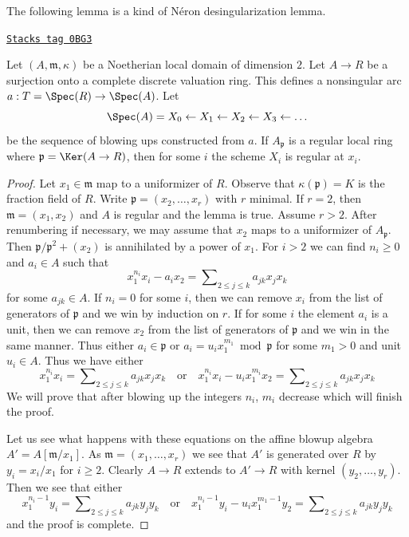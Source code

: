 The following lemma is a kind of N\'eron desingularization lemma.

\begin{lemma}
\label{resolve-lemma-sequence-blowups-along-arc-becomes-nonsingular}
\href{https://stacks.math.columbia.edu/tag/0BG3}{\texttt{Stacks tag 0BG3}}

Let $(A, \mathfrak m, \kappa)$ be a Noetherian local domain of
dimension $2$. Let $A \to R$ be a surjection onto a
complete discrete valuation ring.
This defines a nonsingular arc $a : T = \Spec(R) \to \Spec(A)$. Let
$$
\Spec(A) = X_0 \leftarrow X_1 \leftarrow X_2 \leftarrow X_3 \leftarrow \ldots
$$
be the sequence of blowing ups constructed from $a$.
If $A_\mathfrak p$ is a regular local ring where
$\mathfrak p = \Ker(A \to R)$, then
for some $i$ the scheme $X_i$ is regular at $x_i$.
\end{lemma}

\begin{proof}
Let $x_1 \in \mathfrak m$ map to a uniformizer of $R$.
Observe that $\kappa(\mathfrak p) = K$ is the
fraction field of $R$. Write $\mathfrak p = (x_2, \ldots, x_r)$
with $r$ minimal. If $r = 2$, then $\mathfrak m = (x_1, x_2)$
and $A$ is regular and the lemma is true. Assume $r > 2$.
After renumbering if necessary,
we may assume that $x_2$ maps to a uniformizer of $A_\mathfrak p$.
Then $\mathfrak p/\mathfrak p^2 + (x_2)$ is annihilated by a power
of $x_1$. For $i > 2$ we can find $n_i \geq 0$ and $a_i \in A$
such that
$$
x_1^{n_i} x_i - a_i x_2 = \sum\nolimits_{2 \leq j \leq k} a_{jk} x_jx_k
$$
for some $a_{jk} \in A$. If $n_i = 0$ for some $i$, then we can remove
$x_i$ from the list of generators of $\mathfrak p$ and we win by
induction on $r$. If for some $i$ the element $a_i$ is a unit, then
we can remove $x_2$ from the list of generators of $\mathfrak p$
and we win in the same manner. Thus either
$a_i \in \mathfrak p$ or $a_i = u_i x_1^{m_1} \bmod \mathfrak p$
for some $m_1 > 0$ and unit $u_i \in A$. Thus we have either
$$
x_1^{n_i} x_i = \sum\nolimits_{2 \leq j \leq k} a_{jk} x_jx_k
\quad\text{or}\quad
x_1^{n_i} x_i - u_i x_1^{m_i} x_2 =
\sum\nolimits_{2 \leq j \leq k} a_{jk} x_jx_k
$$
We will prove that after blowing up the integers $n_i$, $m_i$
decrease which will finish the proof.

\medskip\noindent
Let us see what happens with these equations on the affine blowup
algebra $A' = A[\mathfrak m/x_1]$. As $\mathfrak m = (x_1, \ldots, x_r)$
we see that $A'$ is generated over $R$ by $y_i = x_i/x_1$ for $i \geq 2$.
Clearly $A \to R$ extends to $A' \to R$ with kernel
$(y_2, \ldots, y_r)$. Then we see that either
$$
x_1^{n_i - 1} y_i = \sum\nolimits_{2 \leq j \leq k} a_{jk} y_jy_k
\quad\text{or}\quad
x_1^{n_i - 1} y_i - u_i x_1^{m_1 - 1} y_2 =
\sum\nolimits_{2 \leq j \leq k} a_{jk} y_jy_k
$$
and the proof is complete.
\end{proof}

